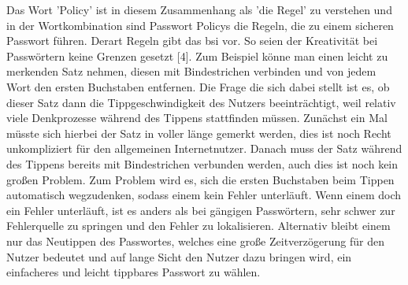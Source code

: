 Das Wort 'Policy' ist in diesem Zusammenhang als 'die Regel' zu verstehen und in der Wortkombination sind Passwort Policys die Regeln, die zu einem sicheren Passwort führen. Derart Regeln gibt das \ac{bsi} vor. So seien der Kreativität bei Passwörtern keine Grenzen gesetzt [4]. Zum Beispiel könne man einen leicht zu merkenden Satz nehmen, diesen mit Bindestrichen verbinden und von jedem Wort den ersten Buchstaben entfernen. Die Frage die sich dabei stellt ist es, ob dieser Satz dann die Tippgeschwindigkeit des Nutzers beeinträchtigt, weil relativ viele Denkprozesse während des Tippens stattfinden müssen. Zunächst ein Mal müsste sich hierbei der Satz in voller länge gemerkt werden, dies ist noch Recht unkompliziert für den allgemeinen Internetnutzer. Danach muss der Satz während des Tippens bereits mit Bindestrichen verbunden werden, auch dies ist noch kein großen Problem. Zum Problem wird es, sich die ersten Buchstaben beim Tippen automatisch wegzudenken, sodass einem kein Fehler unterläuft. Wenn einem doch ein Fehler unterläuft, ist es anders als bei gängigen Passwörtern, sehr schwer zur Fehlerquelle zu springen und den Fehler zu lokalisieren. Alternativ bleibt einem nur das Neutippen des Passwortes, welches eine große Zeitverzögerung für den Nutzer bedeutet und auf lange Sicht den Nutzer dazu bringen wird, ein einfacheres und leicht tippbares Passwort zu wählen.

